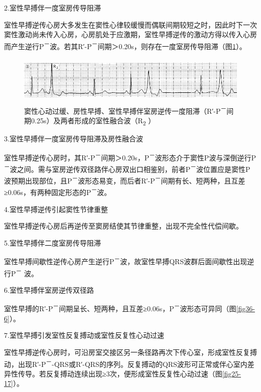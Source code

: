 2.室性早搏伴一度室房传导阻滞

室性早搏逆传心房大多发生在窦性心律较缓慢而偶联间期较短之时，因此时下一次窦性激动尚未传入心房，心房肌处于应激期，室性早搏逆传的激动方得以传入心房而产生逆行P\textsuperscript{－}波。若其R′-P\textsuperscript{－}间期＞0.20s，则存在一度室房传导阻滞（图\ref{fig11-28}）。

\begin{figure}[!htbp]
 \centering
 \includegraphics[width=5.58333in,height=0.90625in]{./images/Image00188.jpg}
 \captionsetup{justification=centering}
 \caption{窦性心动过缓、房性早搏、室性早搏伴室房逆传一度阻滞（R′-P\textsuperscript{－}间期0.25s）及两者形成的室性融合波（R\textsubscript{2} ）}
 \label{fig11-28}
  \end{figure} 


3.室性早搏伴一度室房传导阻滞及房性融合波

室性早搏逆传心房时，其R′-P\textsuperscript{－}间期＞0.20s，P\textsuperscript{－}波形态介于窦性P波与深倒逆行P\textsuperscript{－}波之间。需与室房逆传双径路伴心房双出口相鉴别，前者P\textsuperscript{－}波位置应是窦性P波预期出现部位，且P\textsuperscript{－}波形态易变，而后者R′-P\textsuperscript{－}间期有长、短两种，且互差≥0.06s，有两种固定形态的P\textsuperscript{－}波。

4.室性早搏逆传引起窦性节律重整

室性早搏逆传心房后再逆传至窦房结使其节律重整，出现不完全性代偿间歇。

5.室性早搏伴二度室房传导阻滞

室性早搏间歇性逆传心房产生逆行P\textsuperscript{－}波，故室性早搏QRS波群后面间歇性出现逆行P\textsuperscript{－} 波。

6.室性早搏伴室房逆传双径路

室性早搏的R′-P\textsuperscript{－}间期呈长、短两种，且互差≥0.06s，P\textsuperscript{－}波形态可异同（图\ref{fig36-6}）。

7.室性早搏引发室性反复搏动或室性反复性心动过速

室性早搏逆传心房时，可沿房室交接区另一条径路再次下传心室，形成室性反复搏动，出现R′-P\textsuperscript{－}-QRS或R′-QRS的序列。反复搏动的QRS波形可正常或伴心室内差异性传导。若反复搏动连续出现≥3次，便形成室性反复性心动过速（图\ref{fig25-17}）。

